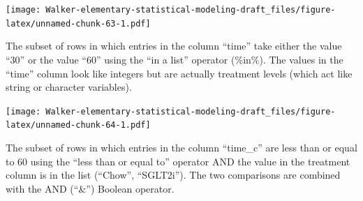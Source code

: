 \documentclass[]{book}
\newenvironment{Shaded}{\begin{snugshade}}{\end{snugshade}}
\newcommand{\DataTypeTok}[1]{\textcolor[rgb]{0.13,0.29,0.53}{#1}}
\newcommand{\DecValTok}[1]{\textcolor[rgb]{0.00,0.00,0.81}{#1}}
\newcommand{\ErrorTok}[1]{\textcolor[rgb]{0.64,0.00,0.00}{\textbf{#1}}}
\newcommand{\KeywordTok}[1]{\textcolor[rgb]{0.13,0.29,0.53}{\textbf{#1}}}
\newcommand{\NormalTok}[1]{#1}
\newcommand{\OperatorTok}[1]{\textcolor[rgb]{0.81,0.36,0.00}{\textbf{#1}}}
\newcommand{\StringTok}[1]{\textcolor[rgb]{0.31,0.60,0.02}{#1}}
\begin{document}
\texttt{[image: Walker-elementary-statistical-modeling-draft\_files/figure-latex/unnamed-chunk-63-1.pdf]}

The subset of rows in which entries in the column ``time'' take either the value ``30'' or the value ``60'' using the ``in a list'' operator (\%in\%). The values in the ``time'' column look like integers but are actually treatment levels (which act like string or character variables).

\begin{Shaded}
\end{Shaded}

\texttt{[image: Walker-elementary-statistical-modeling-draft\_files/figure-latex/unnamed-chunk-64-1.pdf]}

The subset of rows in which entries in the column ``time\_c'' are less than or equal to 60 using the ``less than or equal to'' operator AND the value in the treatment column is in the list (``Chow'', ``SGLT2i''). The two comparisons are combined with the AND (``\&'') Boolean operator.

\begin{Shaded}
\end{Shaded}
\end{document}

